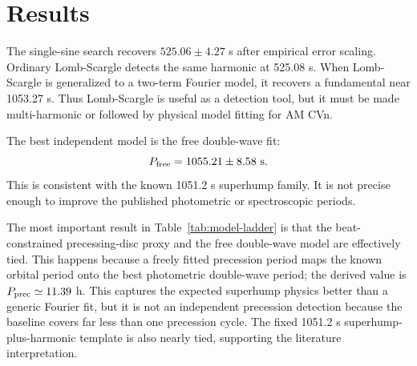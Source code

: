 \documentclass[11pt]{article}
\begin{document}
\section{Results}

The single-sine search recovers \(525.06 \pm 4.27\) s after empirical error
scaling.  Ordinary Lomb-Scargle detects the same harmonic at 525.08 s.  When
Lomb-Scargle is generalized to a two-term Fourier model, it recovers a
fundamental near 1053.27 s.  Thus Lomb-Scargle is useful as a detection tool,
but it must be made multi-harmonic or followed by physical model fitting for AM
CVn.

The best independent model is the free double-wave fit:
\[
P_{\rm free}=1055.21 \pm 8.58~{\rm s}.
\]
This is consistent with the known 1051.2 s superhump family.  It is not precise
enough to improve the published photometric or spectroscopic periods.

\begin{table}[H]
\centering
\caption{AM CVn model ladder.  \(\Delta{\rm BIC}\) is measured relative to the
best free double-wave model; positive values are worse.}
\label{tab:model-ladder}
\end{table}

The most important result in Table~\ref{tab:model-ladder} is that the
beat-constrained precessing-disc proxy and the free double-wave model are
effectively tied.  This happens because a freely fitted precession period maps
the known orbital period onto the best photometric double-wave period; the
derived value is \(P_{\rm prec}\simeq 11.39\) h.  This captures the expected
superhump physics better than a generic Fourier fit, but it is not an
independent precession detection because the baseline covers far less than one
precession cycle.  The fixed 1051.2 s superhump-plus-harmonic template is also
nearly tied, supporting the literature interpretation.
\end{document}
